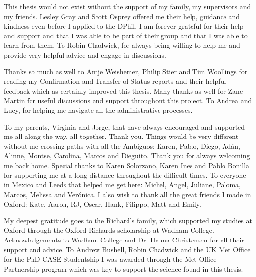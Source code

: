
This thesis would not exist without the support of my family, my supervisors and my friends. 
Lesley Gray and Scott Osprey offered me their help, guidance and kindness even before I applied to the DPhil. I am forever grateful for their help and support and that I was able to be part of their group and that I was able to learn from them.
To Robin Chadwick, for always being willing to help me and provide very helpful advice and engage in discussions.

Thanks so much as well to Antje Weishemer, Philip Stier and Tim Woollings for reading my Confirmation and Transfer of Status reports and their helpful feedback which as certainly improved this thesis.  
Many thanks as well for Zane Martin for useful discussions and support throughout this project.
To Andrea and Lucy, for helping me navigate all the administrative processes.

To my parents, Virginia and Jorge, that have always encouraged and supported me all along the way, all together. Thank you. 
Things would be very different without me crossing paths with all the Ambiguos: Karen, Pablo, Diego, Adán, Alinne, Montse, Carolina, Marcos and Dieguito. Thank you for always welcoming me back home. 
Special thanks to Karen Solorzano, Karen Ines and Pablo Bonilla for supporting me at a long distance throughout the difficult times. 
To everyone in Mexico and Leeds that helped me get here: Michel, Angel, Juliane, Paloma, Marcos, Melissa and Ver\'onica. 
 I also wish to thank all the great friends I made in Oxford: Kate, Aaron, RJ, Oscar, Hank, Filippo, Matt and Emily. 

My deepest gratitude goes to the Richard's family, which supported my studies at Oxford through the Oxford-Richards scholarship at Wadham College. Acknowledgements to Wadham College and Dr. Hanna Christensen for all their support and advice. 
To Andrew Bushell, Robin Chadwick and the UK Met Office for the PhD CASE Studentship I was awarded through the Met Office Partnership program which was key to support the science found in this thesis. 




